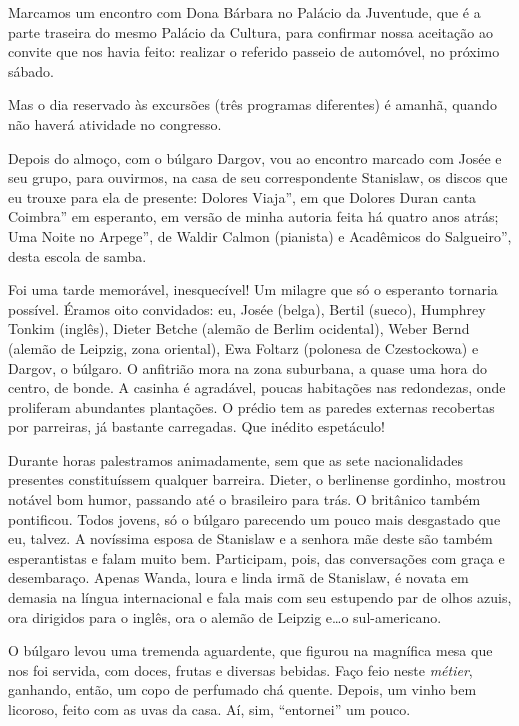 Marcamos um encontro com Dona Bárbara no Palácio da Juventude, que é a parte traseira do mesmo Palácio da Cultura, para confirmar nossa aceitação ao convite que nos havia feito: realizar o referido passeio de automóvel, no próximo sábado.

Mas o dia reservado às excursões (três programas diferentes) é amanhã, quando não haverá atividade no congresso.

Depois do almoço, com o búlgaro Dargov, vou ao encontro marcado com Josée e seu grupo, para ouvirmos, na casa de seu correspondente Stanislaw, os discos que eu trouxe para ela de presente: Dolores Viaja'', em que Dolores Duran canta Coimbra'' em esperanto, em versão de minha autoria feita há quatro anos atrás; Uma Noite no Arpege'', de Waldir Calmon (pianista) e Acadêmicos do Salgueiro'', desta escola de samba.

Foi uma tarde memorável, inesquecível! Um milagre que só o esperanto tornaria possível. Éramos oito convidados: eu, Josée (belga), Bertil (sueco), Humphrey Tonkim (inglês), Dieter Betche (alemão de Berlim ocidental), Weber Bernd (alemão de Leipzig, zona oriental), Ewa Foltarz (polonesa de Czestockowa) e Dargov, o búlgaro. O anfitrião mora na zona suburbana, a quase uma hora do centro, de bonde. A casinha é agradável, poucas habitações nas redondezas, onde proliferam abundantes plantações. O prédio tem as paredes externas recobertas por parreiras, já bastante carregadas. Que inédito espetáculo!

Durante horas palestramos animadamente, sem que as sete nacionalidades presentes constituíssem qualquer barreira. Dieter, o berlinense gordinho, mostrou notável bom humor, passando até o brasileiro para trás. O britânico também pontificou. Todos jovens, só o búlgaro parecendo um pouco mais desgastado que eu, talvez. A novíssima esposa de Stanislaw e a senhora mãe deste são também esperantistas e falam muito bem. Participam, pois, das conversações com graça e desembaraço. Apenas Wanda, loura e linda irmã de Stanislaw, é novata em demasia na língua internacional e fala mais com seu estupendo par de olhos azuis, ora dirigidos para o inglês, ora o alemão de Leipzig e\ldots o sul-americano.

O búlgaro levou uma tremenda aguardente, que figurou na magnífica mesa que nos foi servida, com doces, frutas e diversas bebidas. Faço feio neste \textit{métier}, ganhando, então, um copo de perfumado chá quente. Depois, um vinho bem licoroso, feito com as uvas da casa. Aí, sim, ``entornei'' um pouco.

